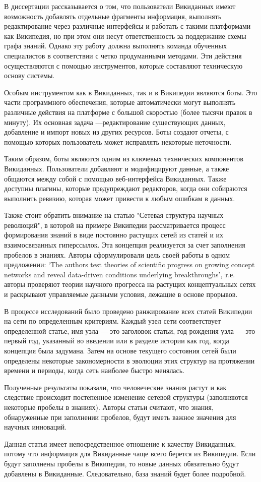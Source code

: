 В диссертации рассказывается о том, что пользователи Викиданных имеют возможность добавлять отдельные фрагменты информация, выполнять редактирование через различные интерфейсы и работать с такими платформами как Википедия, но при этом они несут ответственность за поддержание схемы графа знаний. Однако эту работу должна выполнять команда обученных специалистов в соответствии с четко продуманными методами. Эти действия осуществляются с помощью инструментов, которые составляют техническую основу системы.

Особым инструментом как в Викиданных, так и в Википедии являются боты. Это части программного обеспечения, которые автоматически могут выполнять различные действия на платформе с большой скоростью (более тысячи правок в минуту). Их основная задача ---редактирование существующих данных, добавление и импорт новых из других ресурсов. Боты создают отчеты, с помощью которых пользователь может исправлять некоторые неточности. 

Таким образом, боты являются одним из ключевых технических компонентов Викиданных. Пользователи добавляют и модифицируют данные, а также общаются между собой с помощью веб-интерфейса Викиданных. Также доступны плагины, которые предупреждают редакторов, когда они собираются выполнить ревизию, которая может привести к любым ошибкам в данных.

Также стоит обратить внимание на статью "Сетевая структура научных революций", в которой на примере Википедии рассматривается процесс формирования знаний в виде постоянно растущих сетей из статей и их взаимосвязанных гиперссылок. Эта концепция реализуется за счет заполнения пробелов в знаниях. Авторы сформулировали цель своей работы в одном предложении: ‘The authors test theories of scientific progress on growing concept networks and reveal data-driven conditions underlying breakthroughs’, т.е. авторы проверяют теории научного прогресса на растущих концептуальных сетях и раскрывают управляемые данными условия, лежащие в основе прорывов\cite{Network_structure_revolutions}. 

В процессе исследований было проведено ранжирование всех статей Википедии на сети по определенным критериям. Каждый узел сети соответствует определенной статье, имя узла --- это заголовок статьи, год рождения узла --- это первый год, указанный во введении или в разделе истории как год, когда концепция была задумана. Затем на основе текущего состояния сетей были определены некоторые закономерности в эволюции этих структур на протяжении времени и периоды, когда сеть наиболее быстро менялась.

Полученные результаты показали, что человеческие знания растут и как следствие происходит постепенное изменение сетевой структуры (заполняются некоторые пробелы в знаниях). Авторы статьи считают, что знания, обнаруженные при заполнении пробелов, будут иметь важное значения для научных инноваций. 

Данная статья имеет непосредственное отношение к качеству Викиданных, потому что информация для Викиданные чаще всего берется из Википедии. Если будут заполнены пробелы в Википедии, то новые данных обязательно будут добавлены в Викиданные. Следовательно, база знаний будет более подробной.
